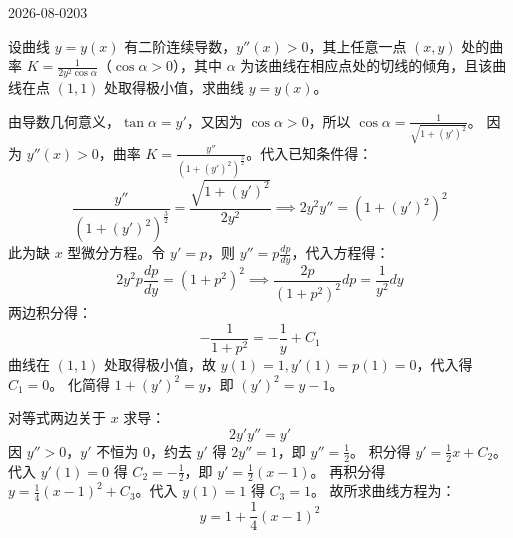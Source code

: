 \begin{mistake}{2026-08-02}{03}

\begin{problemcontent}
设曲线 \(y = y(x)\) 有二阶连续导数，\(y''(x) > 0\)，其上任意一点 \((x, y)\) 处的曲率 \(K = \frac{1}{2y^2 \cos \alpha}\)（\(\cos \alpha > 0\)），其中 \(\alpha\) 为该曲线在相应点处的切线的倾角，且该曲线在点 \((1, 1)\) 处取得极小值，求曲线 \(y = y(x)\)。
\end{problemcontent}

\begin{solutioncontent}
由导数几何意义，\(\tan \alpha = y'\)，又因为 \(\cos \alpha > 0\)，所以 \(\cos \alpha = \frac{1}{\sqrt{1 + (y')^2}}\)。
因为 \(y''(x) > 0\)，曲率 \(K = \frac{y''}{(1 + (y')^2)^{\frac{3}{2}}}\)。代入已知条件得：
\[
\frac{y''}{(1 + (y')^2)^{\frac{3}{2}}} = \frac{\sqrt{1 + (y')^2}}{2y^2} \implies 2y^2 y'' = (1 + (y')^2)^2
\]
此为缺 \(x\) 型微分方程。令 \(y' = p\)，则 \(y'' = p \frac{dp}{dy}\)，代入方程得：
\[
2y^2 p \frac{dp}{dy} = (1 + p^2)^2 \implies \frac{2p}{(1 + p^2)^2} dp = \frac{1}{y^2} dy
\]
两边积分得：
\[
-\frac{1}{1 + p^2} = -\frac{1}{y} + C_1
\]
曲线在 \((1,1)\) 处取得极小值，故 \(y(1) = 1, y'(1) = p(1) = 0\)，代入得 \(C_1 = 0\)。
化简得 \(1 + (y')^2 = y\)，即 \((y')^2 = y - 1\)。

对等式两边关于 \(x\) 求导：
\[
2y' y'' = y'
\]
因 \(y'' > 0\)，\(y'\) 不恒为 \(0\)，约去 \(y'\) 得 \(2y'' = 1\)，即 \(y'' = \frac{1}{2}\)。
积分得 \(y' = \frac{1}{2}x + C_2\)。代入 \(y'(1) = 0\) 得 \(C_2 = -\frac{1}{2}\)，即 \(y' = \frac{1}{2}(x - 1)\)。
再积分得 \(y = \frac{1}{4}(x - 1)^2 + C_3\)。代入 \(y(1) = 1\) 得 \(C_3 = 1\)。
故所求曲线方程为：
\[
y = 1 + \frac{1}{4}(x - 1)^2
\]
\end{solutioncontent}


\end{mistake}
